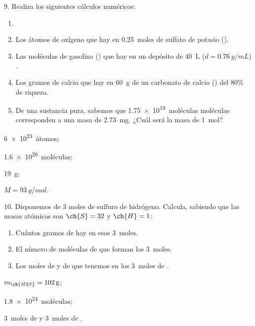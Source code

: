 \documentclass[11pt]{article}
\begin{document}
\begin{multicols}{2}
\begin{exercise}
  9. Realiza los siguientes cálculos numéricos:
  \begin{enumerate}
    \item
    \item Los átomos de oxígeno que hay en \SI{0.25}{moles} de sulfato
    de potasio ().
    \item Las moléculas de gasolina () que hay en un depósito
    de \SI{40}{\liter} ($d = \SI{0.76}{g/mL}$) .
    \item Los gramos de calcio que hay en \SI{60}{g} de un carbonato de
    calcio () del 80\% de riqueza.
    \item De una sustancia pura, sabemos que \SI{1.75e19}{moléculas} moléculas
    corresponden a una masa de \SI{2.73}{mg}. ¿Cuál será la masa de \SI{1}{mol}?
  \end{enumerate}
\end{exercise}
\begin{solution}
  \begin{enumerate*}
    \item \SI{6e23}{átomos}; \item \SI{1.6e26}{moléculas}; \item \SI{19}{g}; \item $M = \SI{93}{g/mol}$.
  \end{enumerate*}
\end{solution}

\begin{exercise}
  10. Disponemos de 3 moles de sulfuro de hidrógeno. Calcula,
  sabiendo que las masas atómicas son $\ch{S} = 32$ y $\ch{H} = 1$:
  \begin{enumerate}
    \item Cuántos gramos de  hay en esos \SI{3}{moles}.
    \item El número de moléculas de  que forman los \SI{3}{moles}.
    \item Los moles de  y de  que tenemos en los \SI{3}{moles} de .
  \end{enumerate}
\end{exercise}
\begin{solution}
  \begin{enumerate*} %
    \item $m_\ch{H2S} = \SI{102}{\gram}$; \item \SI{1.8e24}{moléculas}; \item \SI{3}{moles} de  y \SI{3}{moles} de .
  \end{enumerate*}
\end{solution}


\end{multicols}
\end{document}
